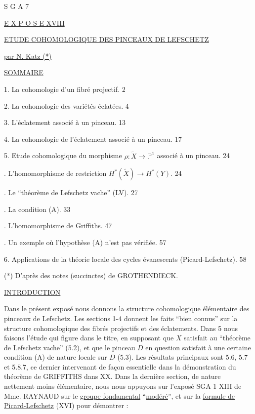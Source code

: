 


S G A 7


\underline{E X P O S E XVIII}


\underline{\underline{ETUDE COHOMOLOGIQUE DES PINCEAUX DE LEFSCHETZ}}


\underline{par N. Katz (*)}


\underline{SOMMAIRE}

1. La cohomologie d'un fibré projectif. \hfill 2

2. La cohomologie des variétés éclatées. \hfill 4

3. L'éclatement associé à un pinceau. \hfill 13

4. La cohomologie de l'éclatement associé à un pinceau. \hfill 17

5. Etude cohomologique du morphisme $\rho : \widetilde{X} \longrightarrow \mathbb{P}^{1}$ associé à un pinceau. \hfill 24

. L'homomorphisme de restriction $H^{*}(\widetilde{X}) \longrightarrow H^{*}(Y)$. \hfill 24

. Le ``théorème de Lefschetz vache'' (LV). \hfill 27

. La condition (A). \hfill 33

. L'homomorphisme de Griffiths. \hfill 47

. Un exemple où l'hypothèse (A) n'est pas vérifiée. \hfill 57

6. Applications de la théorie locale des cycles évanescents (Picard-Lefschetz). \hfill 58

(*) D'après des notes (succinctes) de GROTHENDIECK.




\underline{INTRODUCTION}

Dans le présent exposé nous donnons la structure cohomologique élémentaire des pinceaux de Lefschetz. Les sections 1-4 donnent les faits ``bien connus'' sur la structure cohomologique des fibrés projectifs et des éclatements. Dans 5 nous faisons l'étude qui figure dans le titre, en supposant que $X$ satisfait au ``théorème de Lefschetz vache'' (5.2), et que le pinceau $D$ en question satisfait à une certaine condition (A) de nature locale sur $D$ (5.3). Les résultats principaux sont 5.6, 5.7 et 5.8.7, ce  dernier intervenant de façon essentielle dans la démonstration du théorème de GRIFFITHS dans XX. Dans la dernière section, de nature nettement moins élémentaire, nous nous appuyons sur l'exposé SGA 1 XIII de Mme. RAYNAUD sur le \underline{groupe fondamental} ``\underline{modéré}'', et sur la \underline{formule de Picard-Lefschetz} (XVI) pour démontrer :

